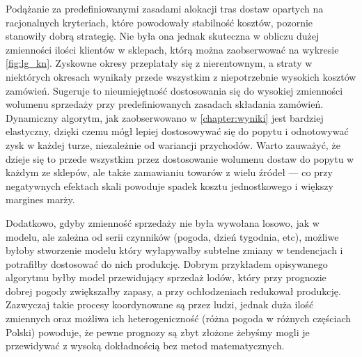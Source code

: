 \documentclass[polish, twoside, 12pt, a4paper]{article}
\theoremstyle{definition}
\theoremstyle{plain}
\theoremstyle{remark}
\begin{document}
Podążanie za predefiniowanymi zasadami alokacji tras dostaw opartych na racjonalnych kryteriach, które powodowały stabilność kosztów, pozornie stanowiły dobrą strategię. Nie była ona jednak skuteczna w obliczu dużej zmienności ilości klientów w sklepach, którą można zaobserwować na wykresie \ref{fig:lg_kn}. Zyskowne okresy przeplatały się z nierentownym, a straty w niektórych okresach wynikały przede wszystkim z niepotrzebnie wysokich kosztów zamówień. Sugeruje to nieumiejętność dostosowania się do wysokiej zmienności wolumenu sprzedaży przy predefiniowanych zasadach składania zamówień. Dynamiczny algorytm, jak zaobserwowano w \ref{chapter:wyniki} jest bardziej elastyczny, dzięki czemu mógł lepiej dostosowywać się do popytu i odnotowywać zysk w każdej turze, niezależnie od wariancji przychodów. Warto zauważyć, że dzieje się to przede wszystkim przez dostosowanie wolumenu dostaw do popytu w każdym ze sklepów, ale także zamawianiu towarów z wielu źródeł --- co przy negatywnych efektach skali powoduje spadek kosztu jednostkowego i większy margines marży.

Dodatkowo, gdyby zmienność sprzedaży nie była wywołana losowo, jak w modelu, ale zależna od serii czynników (pogoda, dzień tygodnia, etc), możliwe byłoby stworzenie modelu który wyłapywałby subtelne zmiany w tendencjach i potrafiłby dostosować do nich produkcję. Dobrym przykładem opisywanego algorytmu byłby model przewidujący sprzedaż lodów, który przy prognozie dobrej pogody zwiększałby zapasy, a przy ochłodzeniach redukował produkcję. Zazwyczaj takie procesy koordynowane są przez ludzi, jednak duża ilość zmiennych oraz możliwa ich heterogeniczność (różna pogoda w różnych częściach Polski) powoduje, że pewne prognozy są zbyt złożone żebyśmy mogli je przewidywać z wysoką dokładnością bez metod matematycznych. 
\end{document}
